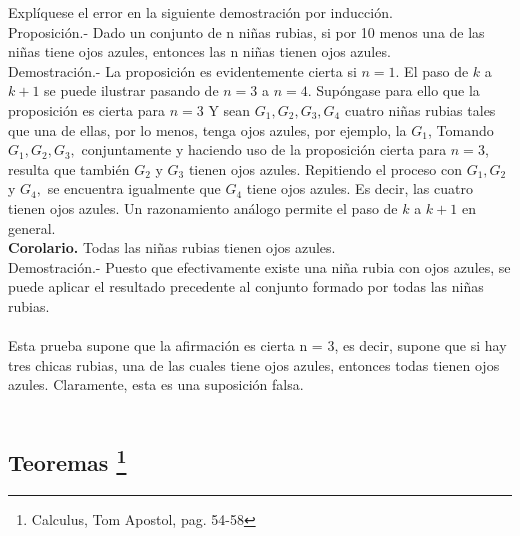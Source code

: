 \begin{teo}
Explíquese el error en la siguiente demostración por inducción.\\
Proposición.- Dado un conjunto de n niñas rubias, si por 10 menos una de las niñas tiene ojos azules, entonces las n niñas tienen ojos azules.\\
Demostración.-\; La proposición es evidentemente cierta si $n = 1$. El paso de $k$ a $k + 1$ se puede ilustrar pasando de $n = 3$ a $n = 4$. Supóngase para ello que la proposición es cierta para $n=3$ Y sean $G_1, G_2, G_3, G_4$ cuatro niñas rubias tales que una de ellas, por lo menos, tenga ojos azules, por ejemplo, la $G_1$, Tomando $G_1,G_2, G_3,$ conjuntamente y haciendo uso de la proposición cierta para $n =3$, resulta que también $G_2$ y $G_3$ tienen ojos azules. Repitiendo el proceso con $G_1, G_2$ y $G_4,$ se encuentra igualmente que $G_4$ tiene ojos azules. Es decir, las cuatro tienen ojos azules. Un razonamiento análogo permite el paso de $k$ a $k + 1$ en general.\\
\textbf{Corolario.} Todas las niñas rubias tienen ojos azules.\\
Demostración.- \; Puesto que efectivamente existe una niña rubia con ojos azules, se puede aplicar el resultado precedente al conjunto formado por todas las niñas rubias.\\\\
Esta prueba supone que la afirmación es cierta n = 3, es decir, supone que si hay tres chicas rubias, una de las cuales tiene ojos azules, entonces todas tienen ojos azules. Claramente, esta es una suposición falsa.\\\\
\end{teo}


\subsection[Teoremas]{Teoremas \footnote{Calculus, Tom Apostol, pag. 54-58}}

